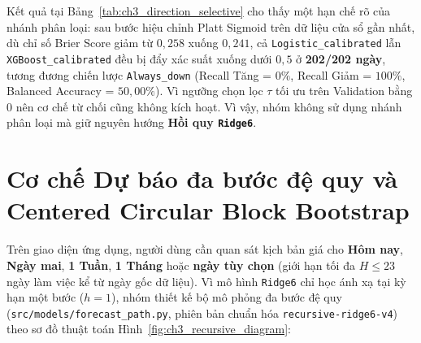 \documentclass[12pt,a4paper]{report}
\begin{document}
\begin{table}[!htbp]
\centering
\caption[Đối chứng phân loại hướng năm 2026]{Kết quả nhánh Phân loại hướng và Selective trên tập năm 2026 ($n=202$, 197 phiên có biến động)}
\label{tab:ch3_direction_selective}
\renewcommand{\arraystretch}{1.18}
\small
\setlength{\tabcolsep}{4.5pt}%
\end{table}

Kết quả tại Bảng~\ref{tab:ch3_direction_selective} cho thấy một hạn chế rõ của nhánh phân loại: sau bước hiệu chỉnh Platt Sigmoid trên dữ liệu cửa sổ gần nhất, dù chỉ số Brier Score giảm từ $0,258$ xuống $0,241$, cả \nolinkurl{Logistic_calibrated} lẫn \nolinkurl{XGBoost_calibrated} đều bị đẩy xác suất xuống dưới $0,5$ ở \textbf{202/202 ngày}, tương đương chiến lược \nolinkurl{Always_down} (Recall Tăng = $0\%$, Recall Giảm = $100\%$, Balanced Accuracy = $50,00\%$). Vì ngưỡng chọn lọc $\tau$ tối ưu trên Validation bằng 0 nên cơ chế từ chối cũng không kích hoạt. Vì vậy, nhóm không sử dụng nhánh phân loại mà giữ nguyên hướng \textbf{Hồi quy \texttt{Ridge6}}.

\section{Cơ chế Dự báo đa bước đệ quy và Centered Circular Block Bootstrap}
Trên giao diện ứng dụng, người dùng cần quan sát kịch bản giá cho \textbf{Hôm nay}, \textbf{Ngày mai}, \textbf{1 Tuần}, \textbf{1 Tháng} hoặc \textbf{ngày tùy chọn} (giới hạn tối đa $H \le 23$ ngày làm việc kể từ ngày gốc dữ liệu). Vì mô hình \texttt{Ridge6} chỉ học ánh xạ tại kỳ hạn một bước ($h=1$), nhóm thiết kế bộ mô phỏng đa bước đệ quy (\nolinkurl{src/models/forecast_path.py}, phiên bản chuẩn hóa \nolinkurl{recursive-ridge6-v4}) theo sơ đồ thuật toán Hình~\ref{fig:ch3_recursive_diagram}:
\end{document}

